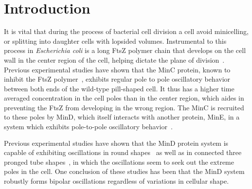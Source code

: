 \documentclass[10pt,letterpaper]{article}
\begin{document}
\section*{Introduction}
It is vital that during the process of bacterial cell
division a cell avoid minicelling, or splitting into daughter cells
with lopsided volumes.  Instrumental to this process in
\emph{Escherichia coli} is a long FtsZ polymer chain that develops on
the cell wall in the center region of the cell, helping dictate the
plane of division~\cite{adams2009bacterial,
  lutkenhaus2007assembly}. Previous experimental studies have shown
that the MinC protein, known to inhibit the FtsZ
polymer~\cite{shen2010examination}, exhibits regular pole to pole
oscillatory behavior between both ends of the wild-type pill-shaped
cell.  It thus has a higher time averaged concentration in the cell
poles than in the center region, which aides in preventing the FtsZ
from developing in the wrong region.  The MinC is recruited to these
poles by MinD, which itself interacts with another protein, MinE, in a
system which exhibits pole-to-pole oscillatory
behavior~\cite{shapiro2009and, yu1999ftsz,
  meacci2005min,huang2003dynamic,kerr2006division,mannik2009bacterial}.

Previous experimental studies have shown that the MinD protein system
is capable of exhibiting oscillations in round
shapes~\cite{fange2006noise} as well as in connected three pronged
tube shapes~\cite{varma2008min}, in which the oscillations seem to
seek out the extreme poles in the cell.  One conclusion of these
studies has been that the MinD system robustly forms bipolar
oscillations regardless of variations in cellular shape.
\end{document}
